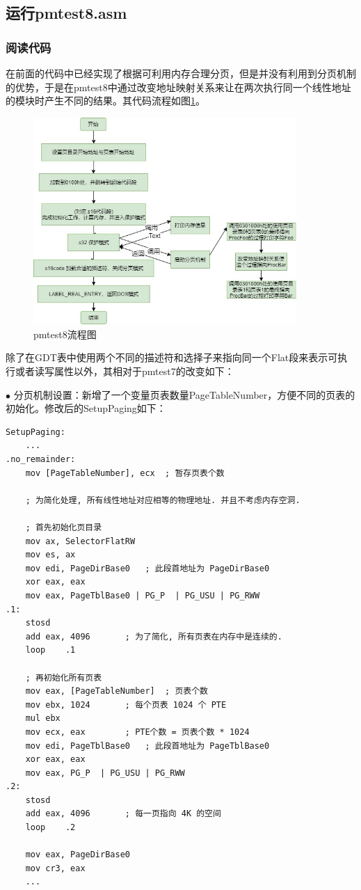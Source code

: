 \documentclass[UTF8,12pt]{ctexart}
\begin{document}
    \subsection{运行pmtest8.asm\label{运行pmtest8}}
    \subsubsection{阅读代码}
    在前面的代码中已经实现了根据可利用内存合理分页，但是并没有利用到分页机制的优势，于是在pmtest8中通过改变地址映射关系来让在两次执行同一个线性地址的模块时产生不同的结果。其代码流程如图\ref{pmtest8流程图}。
    
    \begin{figure}[H]
        \centering
        \includegraphics[width=10cm]{images/pmtest8.jpg}
        \caption{pmtest8流程图}
        \label{pmtest8流程图}
    \end{figure}
    
    除了在GDT表中使用两个不同的描述符和选择子来指向同一个Flat段来表示可执行或者读写属性以外，其相对于pmtest7的改变如下：
    
    $\bullet$ 分页机制设置：新增了一个变量页表数量PageTableNumber，方便不同的页表的初始化。修改后的SetupPaging如下：
    \begin{lstlisting}[language={[x86masm]Assembler}]
SetupPaging:
    ...
.no_remainder:
	mov	[PageTableNumber], ecx	; 暂存页表个数

	; 为简化处理, 所有线性地址对应相等的物理地址. 并且不考虑内存空洞.

	; 首先初始化页目录
	mov	ax, SelectorFlatRW
	mov	es, ax
	mov	edi, PageDirBase0	; 此段首地址为 PageDirBase0
	xor	eax, eax
	mov	eax, PageTblBase0 | PG_P  | PG_USU | PG_RWW
.1:
	stosd
	add	eax, 4096		; 为了简化, 所有页表在内存中是连续的.
	loop	.1

	; 再初始化所有页表
	mov eax, [PageTableNumber]	; 页表个数
	mov	ebx, 1024		; 每个页表 1024 个 PTE
	mul	ebx
	mov	ecx, eax		; PTE个数 = 页表个数 * 1024
	mov	edi, PageTblBase0	; 此段首地址为 PageTblBase0
	xor	eax, eax
	mov	eax, PG_P  | PG_USU | PG_RWW
.2:
	stosd
	add	eax, 4096		; 每一页指向 4K 的空间
	loop	.2

	mov	eax, PageDirBase0
	mov	cr3, eax
    ...
    \end{lstlisting}
    
\end{document}
